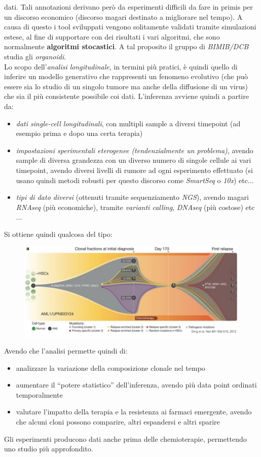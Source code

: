 \documentclass[a4paper,12pt, oneside]{book}
\begin{document}
dati. Tali annotazioni derivano però da esperimenti difficili da fare in primis
per un discorso economico (discorso magari destinato a migliorare nel tempo). A
causa di questo i tool sviluppati vengono solitamente validati tramite
simulazioni estese, al fine di supportare con dei risultati i vari algoritmi,
che sono normalmente \textbf{algoritmi stocastici}. A tal proposito il
gruppo di \textit{BIMIB/DCB} studia gli \textit{organoidi}.\\
Lo scopo dell'\textit{analisi longitudinale}, in termini più pratici, è quindi
quello di inferire un modello generativo che rappresenti un fenomeno evolutivo
(che può essere sia lo studio di un singolo tumore ma anche della diffusione di
un virus) che sia il più consistente possibile coi dati. L'inferenza avviene
quindi a partire da:
\begin{itemize}
  \item \textit{dati single-cell longitudinali}, con multipli sample a diversi
  timepoint (ad esempio prima e dopo una certa terapia)
  \item \textit{impostazioni sperimentali eterogenee (tendenzialmente un
    problema)}, avendo sample di diversa 
  grandezza con un diverso numero di singole cellule ai vari timepoint, avendo
  diversi livelli di 
  rumore ad ogni esperimento effettuato (si usano quindi metodi robusti per
  questo discorso come \textit{SmartSeq} o \textit{10x}) etc$\ldots$
  \item \textit{tipi di dato diversi} (ottenuti tramite sequenziamento
  \textit{NGS}), avendo magari \textit{RNAseq} (più economiche), tramite
  \textit{varianti calling}, \textit{DNAseq} (più costose) 
  etc$\ldots$ 
\end{itemize}
Si ottiene quindi qualcosa del tipo:
\begin{figure}[H]
  \centering
  \includegraphics[scale = 0.23]{img/long.jpg}
\end{figure}
Avendo che l'analisi permette quindi di:
\begin{itemize}
  \item analizzare la variazione della composizione clonale nel tempo
  \item aumentare il ``potere statistico'' dell'inferenza, avendo più data point
  ordinati temporalmente 
  \item valutare l'impatto della terapia e la resistenza ai farmaci emergente,
  avendo che alcuni cloni possono comparire, altri espandersi e altri sparire
\end{itemize}
Gli esperimenti producono dati anche prima delle chemioterapie, permettendo uno
studio più approfondito.
\end{document}
